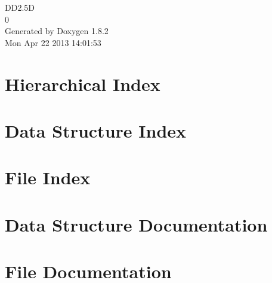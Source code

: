 \documentclass{book}
\begin{document}
\hypersetup{pageanchor=false,citecolor=blue}
\begin{titlepage}
\vspace*{7cm}
\begin{center}
{\Large D\-D2.5\-D \\[1ex]\large 0 }\\
\vspace*{1cm}
{\large Generated by Doxygen 1.8.2}\\
\vspace*{0.5cm}
{\small Mon Apr 22 2013 14:01:53}\\
\end{center}
\end{titlepage}
\clearemptydoublepage
{}
\tableofcontents
\clearemptydoublepage
{}
\hypersetup{pageanchor=true,citecolor=blue}
\chapter{Hierarchical Index}

\chapter{Data Structure Index}

\chapter{File Index}

\chapter{Data Structure Documentation}




\chapter{File Documentation}








\printindex
\end{document}
